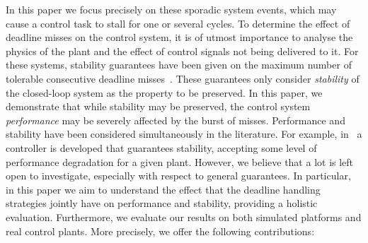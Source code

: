 In this paper we focus precisely on these sporadic
system events, which may cause a control task to stall for one
or several cycles. To determine the effect of deadline misses on the
control system, it is of utmost importance to analyse the physics of the
plant and the effect of control signals not being delivered to it. For
these systems, stability guarantees have been given on the maximum number
of tolerable consecutive deadline misses~\cite{Maggio:2020}. These guarantees only
consider \emph{stability} of the closed-loop system as the property to be
preserved. In this paper, we demonstrate that while stability may be
preserved, the control system \emph{performance} may be severely affected by
the burst of misses. Performance and stability have been considered
simultaneously in the literature. For example, in~\cite{Chakraborty:2018} a controller is developed that guarantees stability, accepting some level of performance degradation for a given plant. However,
we believe that a lot is left open to investigate, especially with respect to general guarantees. In particular, in
this paper we aim to understand the effect that the deadline handling
strategies jointly have on performance and stability, providing a
holistic evaluation. Furthermore, we evaluate our results on both
simulated platforms and real control plants.
More precisely, we offer the following contributions:
%
